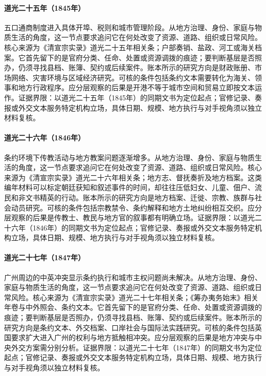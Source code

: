 \hypertarget{social:EQ-1845-TREATY-PORT-OPENING}{}\paragraph{道光二十五年（1845年）}五口通商制度进入具体开埠、税则和城市管理阶段。从地方治理、身份、家庭与物质生活的角度，这一节点要求追问它在何处改变了资源、道路、组织或日常风险。核心来源为《清宣宗实录》道光二十五年相关条；户部奏销、盐政、河工或海关档案。它首先留下的是官府分类、任命、处置或资源调拨的痕迹；要判断基层是否照办，仍须寻找县档、账簿、契约或后续案件。账本所示的研究方向是财政账册、市场网络、灾害环境与区域经济研究。可核的条件包括条约文本需要转化为海关、领事和地方行政程序。应分层观察的后果是开港不等于城市空间和贸易立即按文本运作。证据界限：以道光二十五年（1845年）的同期文书为定位起点；官修记录、奏报或外交文本服务特定机构立场，具体日期、规模、地方执行与对手视角须以独立材料复核。
\hypertarget{social:EQ-1846-MISSIONARY-RETURN}{}\paragraph{道光二十六年（1846年）}条约环境下传教活动与地方教案问题逐渐增多。从地方治理、身份、家庭与物质生活的角度，这一节点要求追问它在何处改变了资源、道路、组织或日常风险。核心来源为《清宣宗实录》道光二十六年相关条；地方志、督抚奏折及地方档案。这类编年材料可以标定朝廷获知和叙述事件的时间，却往往压低妇女、儿童、佃户、流民和非文书精英的行动。账本所示的研究方向是地方档案、迁徙、宗教、族群与社会动员研究。可核的条件包括宗教禁令、条约解释和地方土地纠纷相互交织。应分层观察的后果是传教士、教民与地方官的叙事都有明确立场。证据界限：以道光二十六年（1846年）的同期文书为定位起点；官修记录、奏报或外交文本服务特定机构立场，具体日期、规模、地方执行与对手视角须以独立材料复核。
\hypertarget{social:EQ-1847-GUANGZHOU-CONFLICT}{}\paragraph{道光二十七年（1847年）}广州周边的中英冲突显示条约执行和城市主权问题尚未解决。从地方治理、身份、家庭与物质生活的角度，这一节点要求追问它在何处改变了资源、道路、组织或日常风险。核心来源为《清宣宗实录》道光二十七年相关条；《筹办夷务始末》相关年卷与中外照会、条约文本。它首先留下的是官府分类、任命、处置或资源调拨的痕迹；要判断基层是否照办，仍须寻找县档、账簿、契约或后续案件。账本所示的研究方向是条约文本、外交档案、口岸社会与国际法实践研究。可核的条件包括英国要求扩大进入广州的权利与地方抵触相冲突。应分层观察的后果是地方冲突与中央外交方案需分别分析。证据界限：以道光二十七年（1847年）的同期文书为定位起点；官修记录、奏报或外交文本服务特定机构立场，具体日期、规模、地方执行与对手视角须以独立材料复核。
